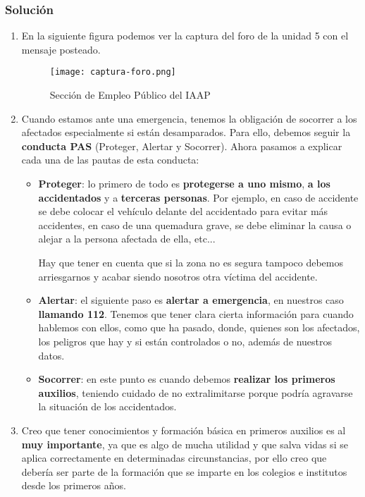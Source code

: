 \subsubsection{Solución}

\begin{enumerate}[label=\alph*.]
    \item En la siguiente figura podemos ver la captura del foro de la unidad 5 con el mensaje posteado.

        \begin{figure}[H]
        \centering
        \texttt{[image: captura-foro.png]}
        \caption{Sección de Empleo Público del IAAP}
    \end{figure}

    \item Cuando estamos ante una emergencia, tenemos la obligación de socorrer a los afectados especialmente si están desamparados.  Para ello, debemos seguir la \textbf{conducta PAS} (Proteger, Alertar y Socorrer). Ahora pasamos a explicar cada una de las pautas de esta conducta:

    \begin{itemize}
        \item \textbf{Proteger}: lo primero de todo es \textbf{protegerse a uno mismo}, \textbf{a los accidentados} y a \textbf{terceras personas}. Por ejemplo, en caso de accidente se debe colocar el vehículo delante del accidentado para evitar más accidentes, en caso de una quemadura grave, se debe eliminar la causa o alejar a la persona afectada de ella, etc...

        Hay que tener en cuenta que si la zona no es segura tampoco debemos arriesgarnos y acabar siendo nosotros otra víctima del accidente.

        \item \textbf{Alertar}: el siguiente paso es \textbf{alertar a emergencia}, en nuestros caso \textbf{llamando 112}. Tenemos que tener clara cierta información para cuando hablemos con ellos, como que ha pasado, donde, quienes son los afectados, los peligros que hay y si están controlados o no, además de nuestros datos.

        \item \textbf{Socorrer}: en este punto es cuando debemos \textbf{realizar los primeros auxilios}, teniendo cuidado de no extralimitarse porque podría agravarse la situación de los accidentados.
    \end{itemize}
    \item Creo que tener conocimientos y formación básica en primeros auxilios es al \textbf{muy importante}, ya que es algo de mucha utilidad y que salva vidas si se aplica correctamente en determinadas circunstancias, por ello creo que debería ser parte de la formación que se imparte en los colegios e institutos desde los primeros años.


\end{enumerate}
